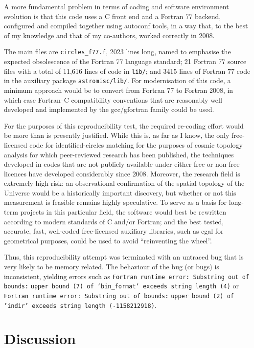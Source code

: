 A more fundamental problem in terms of coding and software
environment evolution is that this code uses a C front end and
a Fortran 77 backend, configured and compiled together using {\sc autoconf}
tools, in a way that, to the best of my knowledge and that of
my co-authors, worked correctly in 2008.

The main files are {\tt circles\_f77.f}, 2023 lines long, named to
emphasise the expected obsolescence of the Fortran 77 language
standard; 21 Fortran 77 source files with a total of 11,616 lines of
code in {\tt lib/}; and 3415 lines of Fortran 77 code in the auxiliary
package {\tt astromisc/lib/}. For modernisation of this code, a
minimum approach would be to convert from Fortran 77 to Fortran 2008,
in which case Fortran--C compatibility conventions that are reasonably well
developed and implemented by the {\sc gcc/gfortran} family could be used.

For the purposes of this reproducibility test, the required re-coding
effort would be more than is presently justified. While this is, as
far as I know, the only free-licensed code for identified-circles
matching for the purposes of cosmic topology analysis for which
peer-reviewed research has been published, the techniques developed in
codes that are not publicly available under either free or non-free
licences have developed considerably since 2008.  Moreover, the
research field is extremely high risk: an observational confirmation
of the spatial topology of the Universe would be a historically
important discovery, but whether or not this measurement is feasible
remains highly speculative. To serve as a basis for long-term
projects in this particular field, the software would best be
rewritten according to modern standards of C and/or Fortran; and
the best tested, accurate, fast, well-coded free-licensed
auxiliary libraries, such as {\sc cgal} for geometrical purposes,
could be used to avoid ``reinventing the wheel''.

Thus, this reproducibility attempt was terminated with
an untraced bug that is very likely to be memory related. The behaviour
of the bug (or bugs) is inconsistent, yielding errors such as
\mbox{{\tt Fortran runtime error: Substring out of bounds:}}
\mbox{{\tt upper bound (7) of 'bin\_format' exceeds string length (4)}} or
\mbox{{\tt Fortran runtime error: Substring out of bounds:}}
\mbox{{\tt upper bound (2) of 'indir' exceeds string length (-1158212918)}}.
\sloppy

\section{Discussion}

